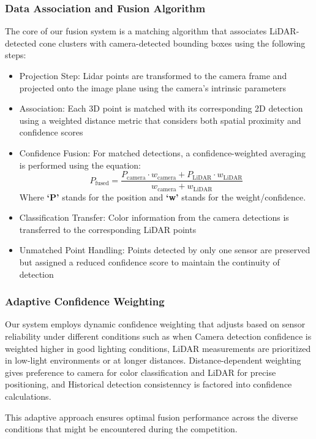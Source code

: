 \documentclass[conference]{IEEEtran}
\begin{document}
\subsubsection{Data Association and Fusion Algorithm}
The core of our fusion system is a matching algorithm that associates LiDAR-detected cone clusters with camera-detected bounding boxes using the following steps:
\begin{itemize}
\item Projection Step: Lidar points are transformed to the camera frame and projected onto the image plane using the camera's intrinsic parameters
\item Association: Each 3D point is matched with its corresponding 2D detection using a weighted distance metric that considers both spatial proximity and confidence scores
\item Confidence Fusion: For matched detections, a confidence-weighted averaging is performed using the equation:
\begin{equation}
P_{\text{fused}} = \frac{P_{\text{camera}} \cdot w_{\text{camera}} + P_{\text{LiDAR}} \cdot w_{\text{LiDAR}}}{w_{\text{camera}} + w_{\text{LiDAR}}}
\end{equation}
Where \textbf{‘P'} stands for the position and \textbf{‘w'} stands for the weight/confidence.
\item Classification Transfer: Color information from the camera detections is transferred to the corresponding LiDAR points
\item Unmatched Point Handling: Points detected by only one sensor are preserved but assigned a reduced confidence score to maintain the continuity of detection
\end{itemize}

\subsubsection{Adaptive Confidence Weighting}
Our system employs dynamic confidence weighting that adjusts based on sensor reliability under different conditions such as when Camera detection confidence is weighted higher in good lighting conditions, LiDAR measurements are prioritized in low-light environments or at longer distances. Distance-dependent weighting gives preference to camera for color classification and LiDAR for precise positioning, and Historical detection consistenncy is factored into confidence calculations.

This adaptive approach ensures optimal fusion performance across the diverse conditions that might be encountered during the competition.
\end{document}
